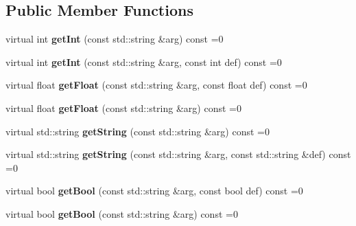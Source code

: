 \subsection*{Public Member Functions}
\begin{DoxyCompactItemize}
\item 
\mbox{\label{class_s_e_p_1_1param_obj_a9157a4251f8a794d595c1e3fd59caad8}} 
virtual int {\bfseries get\+Int} (const std\+::string \&arg) const =0
\item 
\mbox{\label{class_s_e_p_1_1param_obj_a52b0df97b3d2833165a5b5e44e0259c6}} 
virtual int {\bfseries get\+Int} (const std\+::string \&arg, const int def) const =0
\item 
\mbox{\label{class_s_e_p_1_1param_obj_a0852e5ca21dad177f73b274f778b9e31}} 
virtual float {\bfseries get\+Float} (const std\+::string \&arg, const float def) const =0
\item 
\mbox{\label{class_s_e_p_1_1param_obj_a6b41180271a011afa3eb41f078f34322}} 
virtual float {\bfseries get\+Float} (const std\+::string \&arg) const =0
\item 
\mbox{\label{class_s_e_p_1_1param_obj_af3b24272768824c757bc642d75dd9028}} 
virtual std\+::string {\bfseries get\+String} (const std\+::string \&arg) const =0
\item 
\mbox{\label{class_s_e_p_1_1param_obj_a17004b7fb32f9a93865eb0d024c1dd21}} 
virtual std\+::string {\bfseries get\+String} (const std\+::string \&arg, const std\+::string \&def) const =0
\item 
\mbox{\label{class_s_e_p_1_1param_obj_aeeebce97eeb729ef5ced4d9fe9e0cc51}} 
virtual bool {\bfseries get\+Bool} (const std\+::string \&arg, const bool def) const =0
\item 
\mbox{\label{class_s_e_p_1_1param_obj_aad6c285c86427869d715a851eb008787}} 
virtual bool {\bfseries get\+Bool} (const std\+::string \&arg) const =0
\item 
\mbox{\label{class_s_e_p_1_1param_obj_ae0c2183654fb809813fd025d24dd80b6}} 

\end{DoxyCompactItemize}
